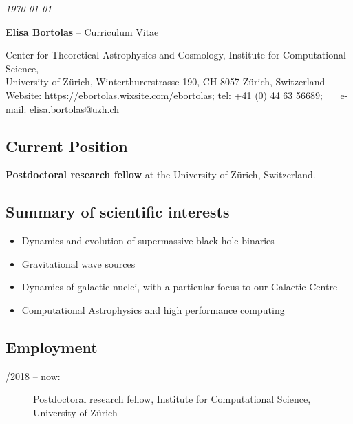 \documentclass[11pt,a4paper]{article}
\begin{document}
\thispagestyle{plain}

\vspace*{-1.6cm}
\begin{flushright}
{ \it \today \ \ \ \ \ \  }
\end{flushright}


\begin{center}
\begin{Large}
{\color{color} {\bf Elisa Bortolas} } -- Curriculum Vitae
\end{Large}

\vspace{0.17cm}
Center for Theoretical Astrophysics and Cosmology, Institute for Computational Science, \\ University of Z\"urich, Winterthurerstrasse
190, CH-8057 Z\"urich, Switzerland\\
Website: { \href{https://ebortolas.wixsite.com/ebortolas}{https://ebortolas.wixsite.com/ebortolas}}; tel: +41 (0) 44 63 56689; \ \ \  e-mail: elisa.bortolas@uzh.ch
\end{center}

\vspace{0.17cm}

\subsection*{Current Position}

{\bf Postdoctoral research fellow} at the University of Z\"urich, Switzerland. 

\subsection*{Summary of scientific interests}
\begin{itemize}
\item Dynamics and evolution of supermassive black hole binaries 
\item Gravitational wave sources
\item Dynamics of galactic nuclei, with a particular focus to our Galactic Centre \item Computational Astrophysics and high performance computing
\end{itemize}

\subsection*{Employment}
\begin{description}
  \item[/2018 -- now:] Postdoctoral research fellow, Institute for Computational Science,  University of Z\"urich 
\end{description}
\end{document}
